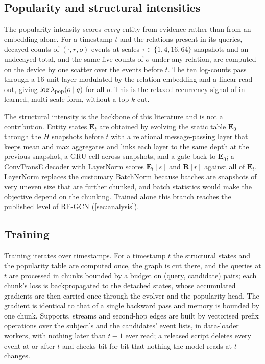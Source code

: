 \subsection{Popularity and structural intensities}

The popularity intensity scores \emph{every} entity from evidence rather than from an embedding alone. For a timestamp $t$ and the relations present in its queries, decayed counts of $(\cdot, r, o)$ events at scales $\tau \in \{1, 4, 16, 64\}$ snapshots and an undecayed total, and the same five counts of $o$ under any relation, are computed on the device by one scatter over the events before $t$. The ten log-counts pass through a 16-unit layer modulated by the relation embedding and a linear read-out, giving $\log\lambda_{\text{pop}}(o \mid q)$ for all $o$. This is the relaxed-recurrency signal of \cite{gastinger2024history} in learned, multi-scale form, without a top-$k$ cut.

The structural intensity is the backbone of this literature and is not a contribution. Entity states $\mathbf{E}_t$ are obtained by evolving the static table $\mathbf{E}_0$ through the $H$ snapshots before $t$ with a relational message-passing layer that keeps mean and max aggregates and links each layer to the same depth at the previous snapshot, a GRU cell across snapshots, and a gate back to $\mathbf{E}_0$; a ConvTransE decoder with LayerNorm scores $\mathbf{E}_t[s]$ and $\mathbf{R}[r]$ against all of $\mathbf{E}_t$. LayerNorm replaces the customary BatchNorm because batches are snapshots of very uneven size that are further chunked, and batch statistics would make the objective depend on the chunking. Trained alone this branch reaches the published level of RE-GCN (\cref{sec:analysis}).

\subsection{Training}

Training iterates over timestamps. For a timestamp $t$ the structural states and the popularity table are computed once, the graph is cut there, and the queries at $t$ are processed in chunks bounded by a budget on (query, candidate) pairs; each chunk's loss is backpropagated to the detached states, whose accumulated gradients are then carried once through the evolver and the popularity head. The gradient is identical to that of a single backward pass and memory is bounded by one chunk. Supports, streams and second-hop edges are built by vectorised prefix operations over the subject's and the candidates' event lists, in data-loader workers, with nothing later than $t-1$ ever read; a released script deletes every event at or after $t$ and checks bit-for-bit that nothing the model reads at $t$ changes.
